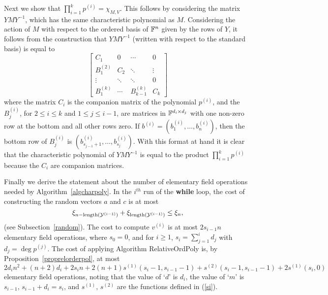 Next we show that $\prod_{i=1}^k p^{(i)} = \chi_{M,V}$. 
This follows by considering
the matrix $YMY^{-1}$, which has the same characteristic polynomial
as $M$. Considering the action of $M$ with respect to the 
ordered basis of $\mathbb{F}^n$ given by the rows of $Y$, it follows from
the construction that $YMY^{-1}$ 
(written with respect to the standard basis) is equal to
\[ \left[\begin{array}{cccc}
 C_1       &   0  & \cdots & 0 \\
 B^{(2)}_1 &  C_2 & \ddots & \vdots \\
 \vdots    &\ddots& \ddots & 0 \\
 B^{(k)}_1 &\cdots& B^{(k)}_{k-1} & C_k
\end{array} \right] \]
where the matrix $C_i$ is the companion matrix of the polynomial $p^{(i)}$,
and the $B^{(i)}_j$, for $2 \le i \le k$ and $1 \le j \le i-1$, are matrices
in $\mathbb{F}^{d_i \times d_j}$
with one non-zero row at the bottom and all other rows zero.
If $b^{(i)} = (b^{(i)}_1,\dots,b^{(i)}_n)$, then the bottom row of 
$B^{(i)}_j$ is $(b^{(i)}_{s_{j-1}+1},\dots,b^{(i)}_{s_j})$.
With this format at hand it is clear that the characteristic polynomial
of $YMY^{-1}$ is equal to the product $\prod_{i=1}^k p^{(i)}$ because
the $C_i$ are companion matrices.

Finally we derive the statement about the number of elementary field operations
needed by Algorithm~\ref{algcharpoly}.
In the $i^{th}$ run of the {\bf while} loop, the cost of constructing the
random vectors $a$ and $c$ is at most 
\[ \xi_{n-\mathrm{length}(\mathcal{Y}^{(i-1)})}+\xi_{\mathrm{length}(\mathcal{Y}^{(i-1)})}
\leq \xi_{n}, 
\]
(see Subsection~\ref{random}). The cost to compute $v^{(i)}$ is 
at most $2s_{i-1}n$ elementary field operations,
where $s_0=0$, and for $i\geq1$, $s_{i}=\sum_{j=1}^{i}d_j$ with 
$d_j=\deg p^{(j)}$. The cost 
of applying Algorithm {\sc RelativeOrdPoly}
is, by Proposition~\ref{proprelorderpol}, at most
\[ 
2d_in^2 + (n+2)d_i +2s_{i}n + 2(n+1)s^{(1)}(s_i-1,s_{i-1}-1) 
+ s^{(2)}(s_i-1,s_{i-1}-1) + 2s^{(1)}(s_i,0) 
\]
elementary field operations, noting that the value 
of `$d$' is $d_i$, the value of `$m$' is $s_{i-1}$, $s_{i-1}+d_i=s_i$,
and $s^{(1)}$, $s^{(2)}$ are the functions defined in (\ref{si}).

